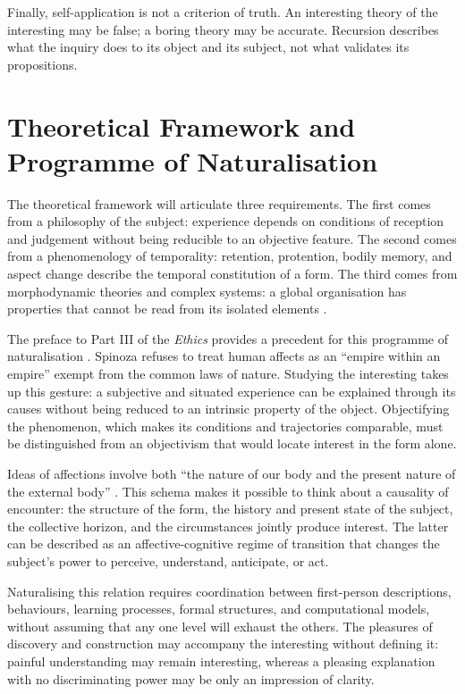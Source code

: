 \documentclass[11pt,a4paper]{article}
\begin{document}
Finally, self-application is not a criterion of truth. An interesting theory of
the interesting may be false; a boring theory may be accurate. Recursion
describes what the inquiry does to its object and its subject, not what validates
its propositions.

\section{Theoretical Framework and Programme of Naturalisation}

The theoretical framework will articulate three requirements. The first comes
from a philosophy of the subject: experience depends on conditions of reception
and judgement without being reducible to an objective feature. The second comes
from a phenomenology of temporality: retention, protention, bodily memory, and
aspect change describe the temporal constitution of a form. The third comes
from morphodynamic theories and complex systems: a global organisation has
properties that cannot be read from its isolated elements
\parencite{petitot1993phenomenologie,petitot2002naturaliser}.

The preface to Part III of the \emph{Ethics} provides a precedent for this
programme of naturalisation \parencite{spinoza1966ethique}. Spinoza refuses to
treat human affects as an ``empire within an empire'' exempt from the common
laws of nature. Studying the interesting takes up this gesture: a subjective
and situated experience can be explained through its causes without being
reduced to an intrinsic property of the object. Objectifying the phenomenon,
which makes its conditions and trajectories comparable, must be distinguished
from an objectivism that would locate interest in the form alone.

Ideas of affections involve both ``the nature of our body and the present nature
of the external body''
\parencite[III, prop. XXVII, dem.]{spinoza1861oeuvres}. This schema makes it
possible to think about a causality of encounter: the structure of the form, the
history and present state of the subject, the collective horizon, and the
circumstances jointly produce interest. The latter can be described as an
affective-cognitive regime of transition that changes the subject's power to
perceive, understand, anticipate, or act.

Naturalising this relation requires coordination between first-person
descriptions, behaviours, learning processes, formal structures, and
computational models, without assuming that any one level will exhaust the
others. The pleasures of discovery and construction
\parencite{feynman1999pleasure,florman1996existential} may accompany the
interesting without defining it: painful understanding may remain interesting,
whereas a pleasing explanation with no discriminating power may be only an
impression of clarity.
\end{document}
